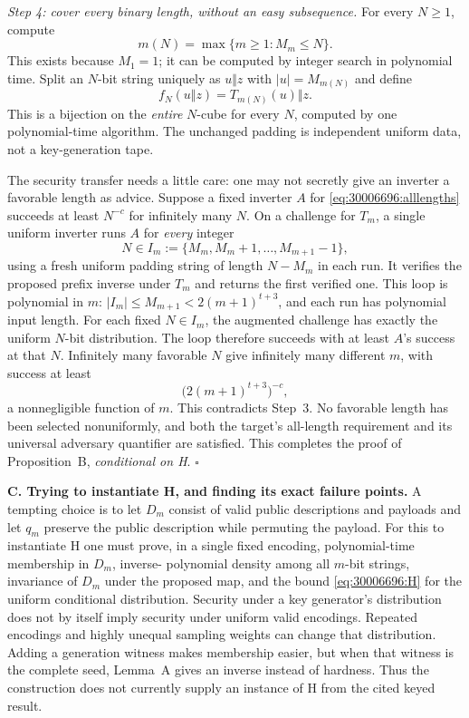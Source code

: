 \documentclass[11pt,a4paper]{article}
\numberwithin{equation}{section}
\begin{document}
\textit{Step 4: cover every binary length, without an easy subsequence.}
For every $N\ge1$, compute
\[
 m(N)=\max\{m\ge1:M_m\le N\}.
\]
This exists because $M_1=1$; it can be computed by integer search in
polynomial time. Split an $N$-bit string uniquely as
$u\Vert z$ with $|u|=M_{m(N)}$ and define
\begin{equation}\label{eq:30006696:alllengths}
 f_N(u\Vert z)=T_{m(N)}(u)\Vert z.
\end{equation}
This is a bijection on the \emph{entire} $N$-cube for every $N$, computed
by one polynomial-time algorithm. The unchanged padding is independent
uniform data, not a key-generation tape.

The security transfer needs a little care: one may not secretly give
an inverter a favorable length as advice. Suppose a fixed inverter $A$
for \eqref{eq:30006696:alllengths} succeeds at least $N^{-c}$ for infinitely
many $N$. On a challenge for $T_m$, a single uniform inverter runs $A$
for \emph{every} integer
\[
 N\in I_m:=\{M_m,M_m+1,\ldots,M_{m+1}-1\},
\]
using a fresh uniform padding string of length $N-M_m$ in each run.
It verifies the proposed prefix inverse under $T_m$ and returns the
first verified one. This loop is polynomial in $m$:
$|I_m|\le M_{m+1}<2(m+1)^{t+3}$, and each run has polynomial input length.
For each fixed $N\in I_m$, the augmented challenge has exactly the
uniform $N$-bit distribution. The loop therefore succeeds with at least
$A$'s success at that $N$. Infinitely many favorable $N$ give infinitely
many different $m$, with success at least
\[
 \bigl(2(m+1)^{t+3}\bigr)^{-c},
\]
a nonnegligible function of $m$. This contradicts Step~3. No favorable
length has been selected nonuniformly, and both the target's
all-length requirement and its universal adversary quantifier are
satisfied. This completes the proof of Proposition~B, \emph{conditional
on H}. \hfill$\square$

\medskip{}
\textbf{C. Trying to instantiate H, and finding its exact failure points.}
A tempting choice is to let $D_m$ consist of valid public descriptions
and payloads and let $q_m$ preserve the public description while
permuting the payload. For this to instantiate H one must prove, in a
single fixed encoding, polynomial-time membership in $D_m$, inverse-
polynomial density among all $m$-bit strings, invariance of $D_m$ under
the proposed map, and the bound \eqref{eq:30006696:H} for the uniform
conditional distribution. Security under a key generator's distribution
does not by itself imply security under uniform valid encodings.
Repeated encodings and highly unequal sampling weights can change that
distribution. Adding a generation witness makes membership easier, but
when that witness is the complete seed, Lemma~A gives an inverse instead
of hardness. Thus the construction does not currently supply an
instance of H from the cited keyed result.
\end{document}
